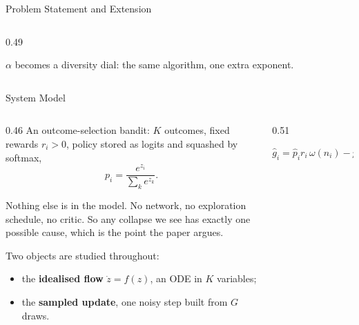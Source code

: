 \documentclass[aspectratio=169,10pt]{beamer}
\begin{document}
\begin{frame}{Problem Statement and Extension}
\begin{columns}[T,onlytextwidth]
\begin{column}{0.49\textwidth}
\vspace{3mm}
{\scriptsize\raggedright
$\alpha$ becomes a \alert{diversity dial}: the same algorithm, one extra
exponent.\par}
\end{column}
\end{columns}
\end{frame}

\begin{frame}{System Model}

\begin{columns}[T,onlytextwidth]
\begin{column}{0.46\textwidth}
\footnotesize
An \alert{outcome-selection bandit}: $K$ outcomes, fixed rewards $r_i>0$, policy
stored as logits and squashed by softmax,
\[
  p_i = \frac{e^{z_i}}{\sum_k e^{z_k}} .
\]

\medskip
Nothing else is in the model. No network, no exploration schedule, no critic. So
any collapse we see has \alert{exactly one possible cause}, which is the point the
paper argues.

\medskip
Two objects are studied throughout:
\begin{itemize}\setlength\itemsep{2pt}
  \item the \textbf{idealised flow} $\dot z=f(z)$, an ODE in $K$ variables;
  \item the \textbf{sampled update}, one noisy step built from $G$ draws.
\end{itemize}
\end{column}

\begin{column}{0.51\textwidth}
\centering
\vspace{1mm}

\vspace{3mm}
{\scriptsize
\[
  \hat g_i=\hat p_i r_i\,\omega(n_i)-p_i\!\sum_k \hat p_k r_k\,\omega(n_k),
  \qquad z\leftarrow z+h\,\hat g
\]}
\end{column}
\end{columns}
\end{frame}
\end{document}
